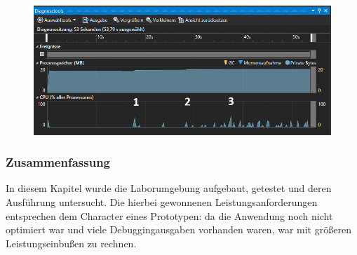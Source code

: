    \begin{figure}[!h]%
        \centering
        \includegraphics[width=14cm]{tex/bilder/6_validierung/Performance.png}
        \label{fig:performance}
    \end{figure}
    
\subsubsection{Zusammenfassung}
    In diesem Kapitel wurde die Laborumgebung aufgebaut, getestet und deren Ausführung untersucht. Die hierbei gewonnenen Leistungsanforderungen entsprechen dem Character eines Prototypen: da die Anwendung noch nicht optimiert war und viele Debuggingausgaben vorhanden waren, war mit größeren Leistungseinbußen zu rechnen.